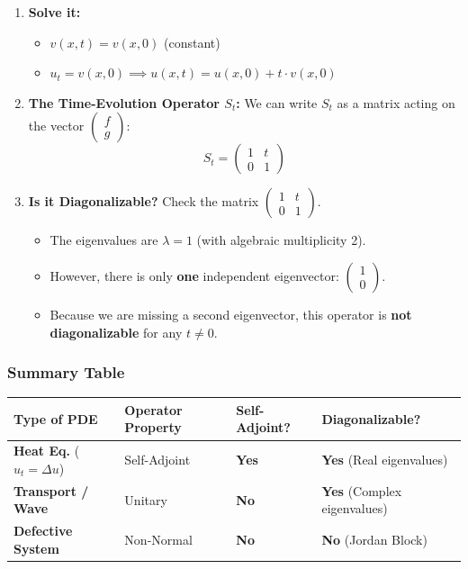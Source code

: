 \documentclass[oneside]{book}
\begin{document}
\begin{enumerate}
    \item \textbf{Solve it:}
    \begin{itemize}
        \item $v(x,t) = v(x,0)$ (constant)
        \item $u_t = v(x,0) \implies u(x,t) = u(x,0) + t \cdot v(x,0)$
    \end{itemize}

    \item \textbf{The Time-Evolution Operator $S_t$:}
    We can write $S_t$ as a matrix acting on the vector $\begin{pmatrix} f \\ g \end{pmatrix}$:
    \[ S_t = \begin{pmatrix} 1 & t \\ 0 & 1 \end{pmatrix} \]

    \item \textbf{Is it Diagonalizable?}
    Check the matrix $\begin{pmatrix} 1 & t \\ 0 & 1 \end{pmatrix}$.
    \begin{itemize}
        \item The eigenvalues are $\lambda = 1$ (with algebraic multiplicity 2).
        \item However, there is only \textbf{one} independent eigenvector: $\begin{pmatrix} 1 \\ 0 \end{pmatrix}$.
        \item Because we are missing a second eigenvector, this operator is \textbf{not diagonalizable} for any $t \neq 0$.
    \end{itemize}
\end{enumerate}

\subsubsection*{Summary Table}

\begin{center}
\begin{tabular}{|l|l|l|l|}
\hline
\textbf{Type of PDE} & \textbf{Operator Property} & \textbf{Self-Adjoint?} & \textbf{Diagonalizable?} \\ \hline
\textbf{Heat Eq.} ($u_t = \Delta u$) & Self-Adjoint & \textbf{Yes} & \textbf{Yes} (Real eigenvalues) \\ \hline
\textbf{Transport / Wave} & Unitary & \textbf{No} & \textbf{Yes} (Complex eigenvalues) \\ \hline
\textbf{Defective System} & Non-Normal & \textbf{No} & \textbf{No} (Jordan Block) \\ \hline
\end{tabular}
\end{center}
\end{document}
